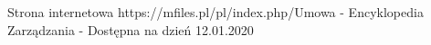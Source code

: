 \begin{thebibliography}{99}
     Strona internetowa https://mfiles.pl/pl/index.php/Umowa - Encyklopedia Zarządzania - Dostępna na dzień 12.01.2020 
\end{thebibliography}